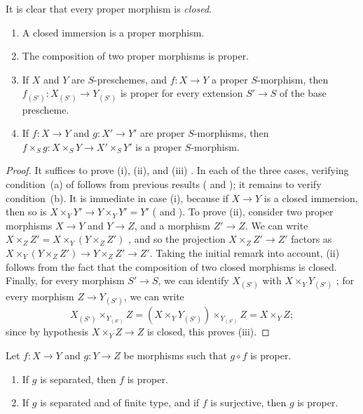 It is clear that every proper morphism is \emph{closed}.

\begin{prop}[5.4.2]
\label{2.5.4.2}
\medskip\noindent
\begin{enumerate}[label=\emph{(\roman*)}]
  \item A closed immersion is a proper morphism.
  \item The composition of two proper morphisms is proper.
  \item If $X$ and $Y$ are $S$-preschemes, and $f:X\to Y$ a proper $S$-morphism, then $f_{(S')}:X_{(S')}\to Y_{(S')}$ is proper for every extension $S'\to S$ of the base prescheme.
  \item If $f:X\to Y$ and $g:X'\to Y'$ are proper $S$-morphisms, then $f\times_S g:X\times_S Y\to X'\times_S Y'$ is a proper $S$-morphism.
\end{enumerate}
\end{prop}

\begin{proof}
\label{proof-2.5.4.2}
It suffices to prove (i), (ii), and (iii) .
In each of the three cases, verifying condition~(a) of  follows from previous results ( and ); it remains to verify condition~(b).
It is immediate in case (i), because if $X\to Y$ is a closed immersion, then so is $X\times_Y Y'\to Y\times_Y Y'=Y'$ ( and ).
To prove (ii), consider two proper morphisms $X\to Y$ and $Y\to Z$, and a morphism $Z'\to Z$.
We can write $X\times_Z Z'=X\times_Y(Y\times_Z Z')$ , and so the projection $X\times_Z Z'\to Z'$ factors as $X\times_Y(Y\times_Z Z')\to Y\times_Z Z'\to Z'$.
Taking the initial remark into account, (ii) follows from the fact that the composition of two closed morphisms is closed.
Finally, for every morphism $S'\to S$, we can identify $X_{(S')}$ with $X\times_Y Y_{(S')}$ ; for every morphism $Z\to Y_{(S')}$, we can write
\[
  X_{(S')}\times_{Y_{(S')}}Z=(X\times_Y Y_{(S')})\times_{Y_{(S')}}Z=X\times_Y Z;
\]
since by hypothesis $X\times_Y Z\to Z$ is closed, this proves (iii).
\end{proof}

\begin{cor}[5.4.3]
\label{2.5.4.3}
Let $f:X\to Y$ and $g:Y\to Z$ be morphisms such that $g\circ f$ is proper.
\begin{enumerate}[label=\emph{(\roman*)}]
  \item If $g$ is separated, then $f$ is proper.
  \item If $g$ is separated and of finite type, and if $f$ is surjective, then $g$ is proper.
\end{enumerate}
\end{cor}

